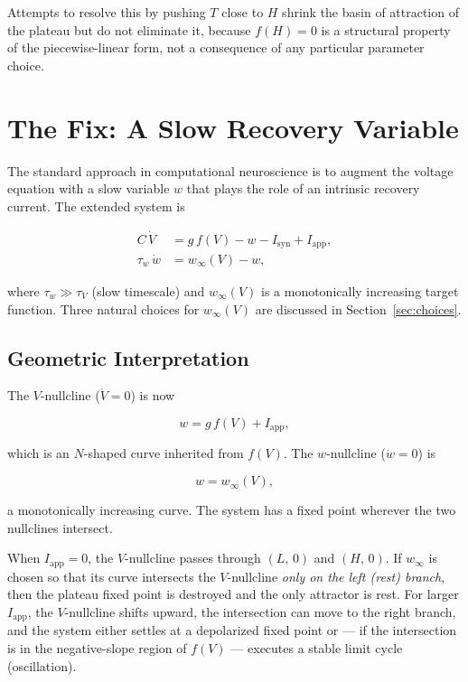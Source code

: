 \documentclass[11pt]{article}
\begin{document}
Attempts to resolve this by pushing $T$ close to $H$ shrink the basin of attraction of the
plateau but do not eliminate it, because $f(H) = 0$ is a structural property of the
piecewise-linear form, not a consequence of any particular parameter choice.

\section{The Fix: A Slow Recovery Variable}

The standard approach in computational neuroscience is to augment the voltage equation with
a slow variable $w$ that plays the role of an intrinsic recovery current. The extended system is

\begin{align}
    C\,\dot{V} &= g\,f(V) - w - I_{\mathrm{syn}} + I_{\mathrm{app}},
    \label{eq:V}\\
    \tau_w\,\dot{w} &= w_\infty(V) - w,
    \label{eq:w}
\end{align}

where $\tau_w \gg \tau_V$ (slow timescale) and $w_\infty(V)$ is a monotonically increasing
target function. Three natural choices for $w_\infty(V)$ are discussed in
Section~\ref{sec:choices}.

\subsection{Geometric Interpretation}

The $V$-nullcline ($\dot{V} = 0$) is now

\begin{equation}
    w = g\,f(V) + I_{\mathrm{app}},
    \label{eq:Vnull}
\end{equation}

which is an $N$-shaped curve inherited from $f(V)$. The $w$-nullcline ($\dot{w} = 0$) is

\begin{equation}
    w = w_\infty(V),
    \label{eq:wnull}
\end{equation}

a monotonically increasing curve. The system has a fixed point wherever the two nullclines
intersect.

When $I_{\mathrm{app}} = 0$, the $V$-nullcline passes through $(L,\,0)$ and $(H,\,0)$.
If $w_\infty$ is chosen so that its curve intersects the $V$-nullcline \emph{only on the
left (rest) branch}, then the plateau fixed point is destroyed and the only attractor is
rest. For larger $I_{\mathrm{app}}$, the $V$-nullcline shifts upward, the intersection
can move to the right branch, and the system either settles at a depolarized fixed point
or --- if the intersection is in the negative-slope region of $f(V)$ --- executes a stable
limit cycle (oscillation).
\end{document}
